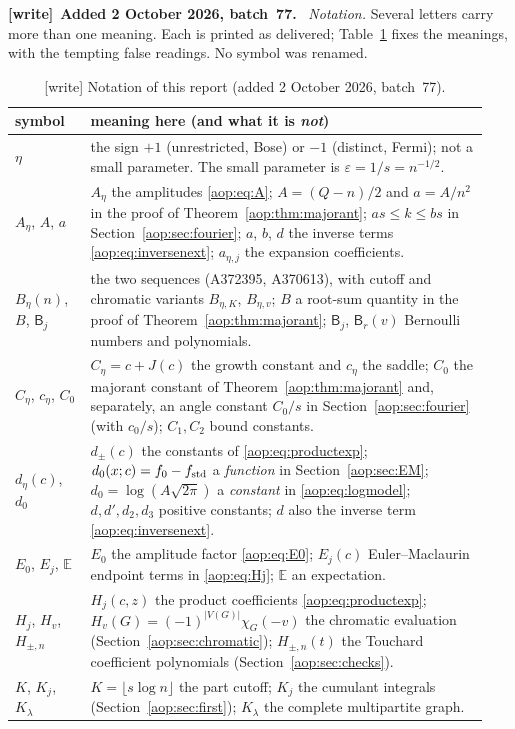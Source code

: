 \documentclass[11pt]{article}
\theoremstyle{remark}\newtheorem{remark}[theorem]{Remark}
\newcommand{\E}{\mathbb E}
\newcommand{\eps}{\varepsilon}
\newenvironment{writenote}[1][]{\par\smallskip\begingroup\small
 \noindent\textbf{[write]}\if\relax\detokenize{#1}\relax\else~\textbf{#1.}\fi\ }%
 {\par\endgroup\smallskip}
\begin{document}
\begin{writenote}[Added 2 October 2026, batch~77]
\emph{Notation.} Several letters carry more than one meaning. Each is
printed as delivered; Table~\ref{aop:tab:notation} fixes the meanings, with
the tempting false readings. No symbol was renamed.
\begin{table}[tbp]\centering\footnotesize
\caption{[write] Notation of this report (added 2 October 2026, batch~77).}\label{aop:tab:notation}
\begin{tabular}{@{}p{0.15\linewidth}p{0.79\linewidth}@{}}
\toprule
symbol & meaning here (and what it is \emph{not})\\
\midrule
$\eta$ & the sign $+1$ (unrestricted, Bose) or $-1$ (distinct, Fermi); not a small parameter. The small parameter is $\eps=1/s=n^{-1/2}$.\\
$A_\eta$, $A$, $a$ & $A_\eta$ the amplitudes \eqref{aop:eq:A}; $A=(Q-n)/2$ and $a=A/n^2$ in the proof of Theorem~\ref{aop:thm:majorant}; $as\le k\le bs$ in Section~\ref{aop:sec:fourier}; $a$, $b$, $d$ the inverse terms \eqref{aop:eq:inversenext}; $a_{\eta,j}$ the expansion coefficients.\\
$B_\eta(n)$, $B$, $\mathsf B_j$ & the two sequences (A372395, A370613), with cutoff and chromatic variants $B_{\eta,K}$, $B_{\eta,v}$; $B$ a root-sum quantity in the proof of Theorem~\ref{aop:thm:majorant}; $\mathsf B_j$, $\mathsf B_r(v)$ Bernoulli numbers and polynomials.\\
$C_\eta$, $c_\eta$, $C_0$ & $C_\eta=c+J(c)$ the growth constant and $c_\eta$ the saddle; $C_0$ the majorant constant of Theorem~\ref{aop:thm:majorant} and, separately, an angle constant $C_0/s$ in Section~\ref{aop:sec:fourier} (with $c_0/s$); $C_1,C_2$ bound constants.\\
$d_\eta(c)$, $d_0$ & $d_\pm(c)$ the constants of \eqref{aop:eq:productexp}; $d_0(x;c)=f_0-f_{\rm std}$ a \emph{function} in Section~\ref{aop:sec:EM}; $d_0=\log(A\sqrt{2\pi})$ a \emph{constant} in \eqref{aop:eq:logmodel}; $d,d',d_2,d_3$ positive constants; $d$ also the inverse term \eqref{aop:eq:inversenext}.\\
$E_0$, $E_j$, $\E$ & $E_0$ the amplitude factor \eqref{aop:eq:E0}; $E_j(c)$ Euler--Maclaurin endpoint terms in \eqref{aop:eq:Hj}; $\E$ an expectation.\\
$H_j$, $H_v$, $H_{\pm,n}$ & $H_j(c,z)$ the product coefficients \eqref{aop:eq:productexp}; $H_v(G)=(-1)^{|V(G)|}\chi_G(-v)$ the chromatic evaluation (Section~\ref{aop:sec:chromatic}); $H_{\pm,n}(t)$ the Touchard coefficient polynomials (Section~\ref{aop:sec:checks}).\\
$K$, $K_j$, $K_\lambda$ & $K=\lfloor s\log n\rfloor$ the part cutoff; $K_j$ the cumulant integrals (Section~\ref{aop:sec:first}); $K_\lambda$ the complete multipartite graph.\\

\end{tabular}
\end{table}
\end{writenote}
\end{document}
